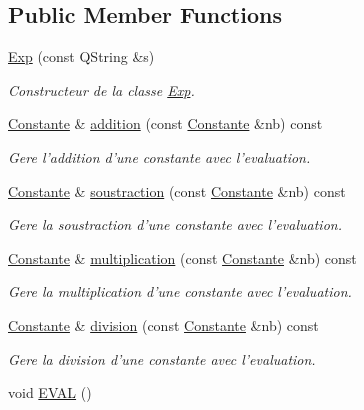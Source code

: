\subsection*{\-Public \-Member \-Functions}
\begin{DoxyCompactItemize}
\item 
\hyperlink{class_l_o21_1_1_exp_a90c8e9f7a2f15a9a72423b703d5ec182}{\-Exp} (const \-Q\-String \&s)
\begin{DoxyCompactList}\small\item\em \-Constructeur de la classe \hyperlink{class_l_o21_1_1_exp}{\-Exp}. \end{DoxyCompactList}\item 
\hyperlink{class_l_o21_1_1_constante}{\-Constante} \& \hyperlink{class_l_o21_1_1_exp_afdb7c0687e2b8cda07ff85bd86299866}{addition} (const \hyperlink{class_l_o21_1_1_constante}{\-Constante} \&nb) const 
\begin{DoxyCompactList}\small\item\em \-Gere l'addition d'une constante avec l'evaluation. \end{DoxyCompactList}\item 
\hyperlink{class_l_o21_1_1_constante}{\-Constante} \& \hyperlink{class_l_o21_1_1_exp_ab4f295f8ce2768312576d76c26b6caa7}{soustraction} (const \hyperlink{class_l_o21_1_1_constante}{\-Constante} \&nb) const 
\begin{DoxyCompactList}\small\item\em \-Gere la soustraction d'une constante avec l'evaluation. \end{DoxyCompactList}\item 
\hyperlink{class_l_o21_1_1_constante}{\-Constante} \& \hyperlink{class_l_o21_1_1_exp_a6f72d9ff76fa8479d8e035eb4d1f30f0}{multiplication} (const \hyperlink{class_l_o21_1_1_constante}{\-Constante} \&nb) const 
\begin{DoxyCompactList}\small\item\em \-Gere la multiplication d'une constante avec l'evaluation. \end{DoxyCompactList}\item 
\hyperlink{class_l_o21_1_1_constante}{\-Constante} \& \hyperlink{class_l_o21_1_1_exp_ac957713a5ae0c400745b3c76a5a00eba}{division} (const \hyperlink{class_l_o21_1_1_constante}{\-Constante} \&nb) const 
\begin{DoxyCompactList}\small\item\em \-Gere la division d'une constante avec l'evaluation. \end{DoxyCompactList}\item 
\hypertarget{class_l_o21_1_1_exp_a4bf22a079395805f4e6ec3e9e254090f}{void \hyperlink{class_l_o21_1_1_exp_a4bf22a079395805f4e6ec3e9e254090f}{\-E\-V\-A\-L} ()}\label{class_l_o21_1_1_exp_a4bf22a079395805f4e6ec3e9e254090f}


\end{DoxyCompactItemize}

